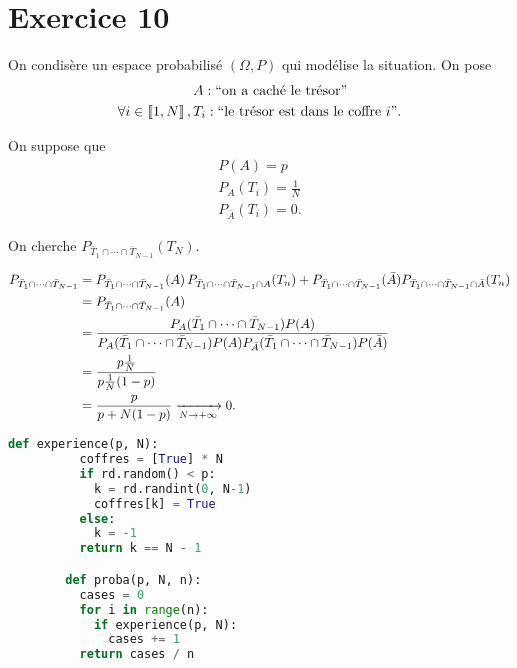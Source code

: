 \part{Exercice 10}

On condisère un espace probabilisé $(\Omega, P)$ qui modélise la situation.
On pose
\begin{align*}
	&A : ``\text{on a caché le trésor}"\\
	\forall i \in \left\llbracket 1,N \right\rrbracket,\,&T_i : ``\text{le trésor est dans le coffre } i".
\end{align*}

On suppose que
\begin{gather*}
	P(A) = p\\
	P_A(T_i) = \frac{1}{N}\\
	P_{\overline{A}} (T_i) = 0.
\end{gather*}

On cherche $P_{\overline{T}_1 \cap \cdots \cap \overline{T}_{N-1}}(T_N)$.

\begin{align*}
	P_{\bar{T}_1 \cap \cdots \cap \bar{T}_{N-1}} &= P_{\bar{T}_1 \cap \cdots \cap \bar{T}_{N-1}}(A)\,P_{\bar{T}_1 \cap \cdots \cap \bar{T}_{N-1}\cap A}(T_n)
	+ P_{\bar{T}_1 \cap \cdots \cap \bar{T}_{N-1}}(\bar{A}) P_{\bar{T}_1 \cap \cdots \cap \bar{T}_{N-1} \cap \bar{A}}(T_n)\\
	&= P_{\bar{T}_1 \cap \cdots \cap \bar{T}_{N-1}}(A) \\
	&= \frac{P_A(\bar{T}_1 \cap \cdots \cap \bar{T}_{N-1}) P(A)}{P_A(\bar{T}_1 \cap \cdots \cap \bar{T}_{N-1}) P(A) P_{\bar{A}}(\bar{T}_1 \cap \cdots \cap \bar{T}_{N-1}) P(\bar{A})} \\
	&= \frac{p \frac{1}{N}}{p \frac{1}{N} (1-p)} \\
	&= \frac{p}{p + N (1-p)} \xrightarrow[N\to +\infty]{} 0. \\
\end{align*}


\begin{center}
	\begin{lstlisting}[language=python]
		def experience(p, N):
		  coffres = [True] * N
		  if rd.random() < p:
		    k = rd.randint(0, N-1)
		    coffres[k] = True
		  else:
		    k = -1
		  return k == N - 1

		def proba(p, N, n):
		  cases = 0
		  for i in range(n):
		    if experience(p, N):
		      cases += 1
		  return cases / n
	\end{lstlisting}
\end{center}

